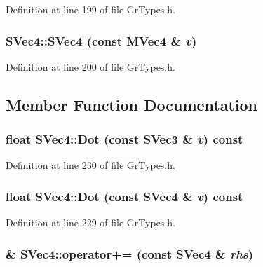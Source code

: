 Definition at line 199 of file GrTypes.h.\hypertarget{struct_s_vec4_ee214f138cc9b1d2b15b2c7ddbf4ffad}{
\subsubsection[{SVec4}]{\setlength{\rightskip}{0pt plus 5cm}SVec4::SVec4 (const {\bf MVec4} \& {\em v})}}
\label{struct_s_vec4_ee214f138cc9b1d2b15b2c7ddbf4ffad}




Definition at line 200 of file GrTypes.h.

\subsection{Member Function Documentation}
\hypertarget{struct_s_vec4_26a0c27e2e6586043ea9a04d16e5fe56}{
\subsubsection[{Dot}]{\setlength{\rightskip}{0pt plus 5cm}float SVec4::Dot (const {\bf SVec3} \& {\em v}) const}}
\label{struct_s_vec4_26a0c27e2e6586043ea9a04d16e5fe56}




Definition at line 230 of file GrTypes.h.\hypertarget{struct_s_vec4_f27625f868b06288cf93eba125dff64c}{
\subsubsection[{Dot}]{\setlength{\rightskip}{0pt plus 5cm}float SVec4::Dot (const {\bf SVec4} \& {\em v}) const}}
\label{struct_s_vec4_f27625f868b06288cf93eba125dff64c}




Definition at line 229 of file GrTypes.h.\hypertarget{struct_s_vec4_a9fbbae509431eded36093a211311fcd}{
\subsubsection[{operator+=}]{\& SVec4::operator+= (const {\bf SVec4} \& {\em rhs})}}
\label{struct_s_vec4_a9fbbae509431eded36093a211311fcd}




